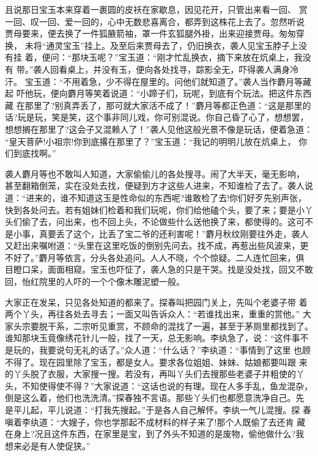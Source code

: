 且说那日宝玉本来穿着一裹圆的皮袄在家歇息，因见花开，只管出来看一回、
赏一回、叹一回、爱一回的，心中无数悲喜离合，都弄到这株花上去了。忽然听说
贾母要来，便去换了一件狐腋箭袖，罩一件玄狐腿外褂，出来迎接贾母。匆匆穿换，
未将“通灵宝玉”挂上。及至后来贾母去了，仍旧换衣，袭人见宝玉脖子上没有挂
着，便问：“那块玉呢？”宝玉道：“刚才忙乱换衣，摘下来放在炕桌上，我没有
带。”袭人回看桌上，并没有玉，便向各处找寻，踪影全无，吓得袭人满身冷汗。
宝玉道：“不用着急，少不得在屋里的。问他们就知道了。”袭人当作麝月等藏起
吓他玩，便向麝月等笑着说道：“小蹄子们，玩呢，到底有个玩法。把这件东西藏
在那里了?别真弄丢了，那可就大家活不成了！”麝月等都正色道：“这是那里的
话?玩是玩，笑是笑，这个事非同儿戏，你可别混说。你自己昏了心了，想想罢，
想想搁在那里了?这会子又混赖人了！”袭人见他这般光景不像是玩话，便着急道：
“皇天菩萨!小祖宗!你到底撂在那里了？”宝玉道：“我记的明明儿放在炕桌上，
你们到底找啊。”

袭人麝月等也不敢叫人知道，大家偷偷儿的各处搜寻。闹了大半天，毫无影响，
甚至翻箱倒笼，实在没处去找，便疑到方才这些人进来，不知谁检了去了。袭人说
道：“进来的，谁不知道这玉是性命似的东西呢?谁敢检了去!你们好歹先别声张，
快到各处问去。若有姐妹们检着和我们玩呢，你们给他磕个头，要了来；要是小丫
头们偷了去，问出来，也不回上头，不论做些什么送他换了来，都使得的。这可不
是小事，真要丢了这个，比丢了宝二爷的还利害呢！”麝月秋纹刚要往外走，袭人
又赶出来嘱咐道：“头里在这里吃饭的倒别先问去。找不成，再惹出些风波来，更
不好了。”麝月等依言，分头各处追问。人人不晓，个个惊疑。二人连忙回来，俱
目瞪口呆，面面相窥。宝玉也吓怔了，袭人急的只是干哭。找是没处找，回又不敢
回，怡红院里的人吓的一个个像木雕泥塑一般。

大家正在发呆，只见各处知道的都来了。探春叫把园门关上，先叫个老婆子带
着两个丫头，再往各处去寻去；一面又叫告诉众人：“若谁找出来，重重的赏他。”
大家头宗要脱干系，二宗听见重赏，不顾命的混找了一遍，甚至于茅厕里都找到了。
谁知那块玉竟像绣花针儿一般，找了一天，总无影响。李纨急了，说：“这件事不
是玩的，我要说句无礼的话了。”众人道：“什么话？”李纨道：“事情到了这里
也顾不得了。现在园里除了宝玉，都是女人。要求各位姐姐、妹妹、姑娘都要叫跟
来的丫头脱了衣服，大家搜一搜。若没有，再叫丫头们去搜那些老婆子并粗使的丫
头，不知使得使不得？”大家说道：“这话也说的有理。现在人多手乱，鱼龙混杂，
倒是这么着，他们也洗洗清。”探春独不言语。那些丫头们也都愿意洗净自己。先
是平儿起，平儿说道：“打我先搜起。”于是各人自己解怀。李纨一气儿混搜。探
春嗔着李纨道：“大嫂子，你也学那起不成材料的样子来了!那个人既偷了去还肯
藏在身上?况且这件东西，在家里是宝，到了外头不知道的是废物，偷他做什么?我
想来必是有人使促狭。”


